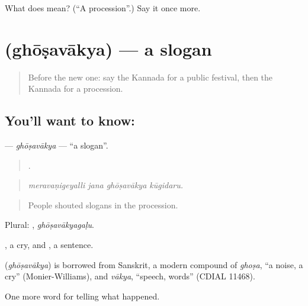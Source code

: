 \begin{tcolorbox}[breakable,colback=teal!4,colframe=teal!35!black,title={Before you move on}]
What does  mean? (\textquotedblleft{}A procession\textquotedblright{}.) Say it once more.
\end{tcolorbox}
\section[\texorpdfstring{\kn{ಘೋಷವಾಕ್ಯ} (ghōṣavākya)}{ಘೋಷವಾಕ್ಯ (ghōṣavākya)}]{ (ghōṣavākya) — a slogan}

\label{lesson:KA-C359-ghosavakya}



\begin{quote}
Before the new one: say the Kannada for a public festival, then the Kannada for a procession.
\end{quote}

\subsection*{You'll want to know: }
\textbf{} — \emph{ghōṣavākya} — \textquotedblleft{}a slogan\textquotedblright{}.

\begin{quote}
   .
\end{quote}

\begin{quote}
\emph{meravaṇigeyalli jana ghōṣavākya kūgidaru.}
\end{quote}

\begin{quote}
People shouted slogans in the procession.
\end{quote}

Plural: , \emph{ghōṣavākyagaḷu}.

, a cry, and , a sentence.

\begin{cousinweb}
\textbf{} (\emph{ghōṣavākya}) is borrowed from Sanskrit, a modern compound of \emph{ghoṣa}, \textquotedblleft{}a noise, a cry\textquotedblright{} (Monier-Williams), and \emph{vākya}, \textquotedblleft{}speech, words\textquotedblright{} (CDIAL 11468).
\end{cousinweb}

\begin{grammarlens}[title={What you've built}]
One more word for telling what happened.
\end{grammarlens}

